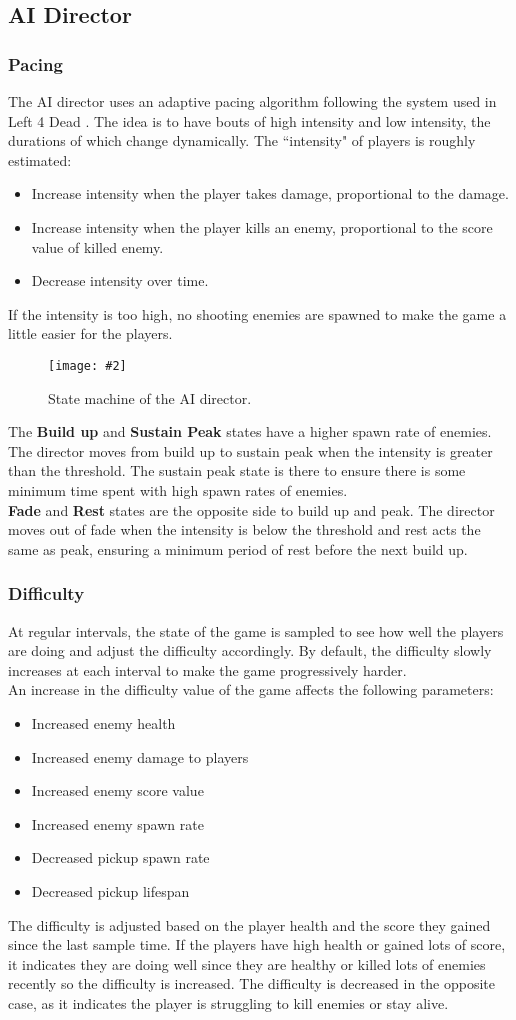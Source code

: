 \documentclass{article}
\newcommand{\n}[0]{\\[\baselineskip]}
\newcommand{\figimg}[3]{
  \begin{figure}[H]
    \centering
    \texttt{[image: \#2]}
    \caption{#3}
  \end{figure}
  \noindent 
}
\begin{document}
\subsection{AI Director}
\subsubsection{Pacing}
The AI director uses an adaptive pacing algorithm following the system used in Left 4 Dead \cite{l4d}. The idea is to have bouts of high intensity and low intensity, the durations of which change dynamically. The ``intensity" of players is roughly estimated:
\begin{itemize}
\item Increase intensity when the player takes damage, proportional to the damage.
\item Increase intensity when the player kills an enemy, proportional to the score value of killed enemy.
\item Decrease intensity over time. 
\end{itemize}
\noindent
If the intensity is too high, no shooting enemies are spawned to make the game a little easier for the players.

\figimg{0.7}{imgs/DirectorFSM.png}{State machine of the AI director.}
The \textbf{Build up} and \textbf{Sustain Peak} states have a higher spawn rate of enemies. The director moves from build up to sustain peak when the intensity is greater than the threshold. The sustain peak state is there to ensure there is some minimum time spent with high spawn rates of enemies. 
\n
\textbf{Fade} and \textbf{Rest} states are the opposite side to build up and peak. The director moves out of fade when the intensity is below the threshold and rest acts the same as peak, ensuring a minimum period of rest before the next build up.
\subsubsection{Difficulty}
At regular intervals, the state of the game is sampled to see how well the players are doing and adjust the difficulty accordingly. By default, the difficulty slowly increases at each interval to make the game progressively harder.
\n
An increase in the difficulty value of the game affects the following parameters:
\begin{itemize}
\item Increased enemy health
\item Increased enemy damage to players
\item Increased enemy score value
\item Increased enemy spawn rate
\item Decreased pickup spawn rate
\item Decreased pickup lifespan
\end{itemize}
The difficulty is adjusted based on the player health and the score they gained since the last sample time. If the players have high health or gained lots of score, it indicates they are doing well since they are healthy or killed lots of enemies recently so the difficulty is increased. The difficulty is decreased in the opposite case, as it indicates the player is struggling to kill enemies or stay alive.
\end{document}
